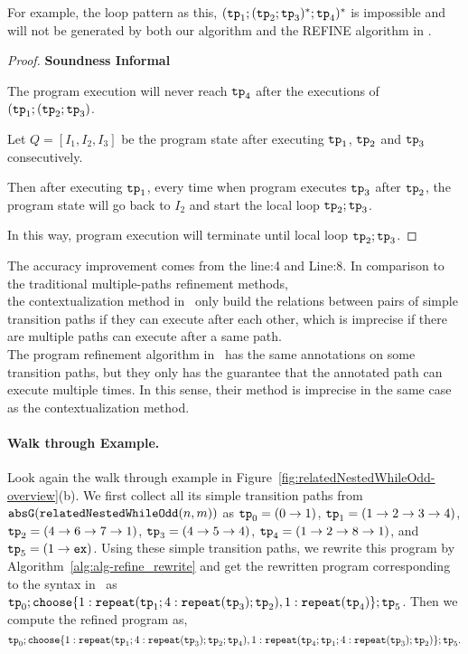   For example, the loop pattern as this,
  $(\mathtt{tp}_1;(\mathtt{tp}_2;\mathtt{tp}_{3})^*;\mathtt{tp}_4)^*$ is impossible 
  and will not be generated by both our algorithm and the REFINE algorithm in \cite{GulwaniJK09}.
\begin{proof}
\textbf{Soundness Informal}

The program execution will never reach $\mathtt{tp}_4$ after the executions of
$(\mathtt{tp}_1;(\mathtt{tp}_2;\mathtt{tp}_{3})$.

Let $Q = [I_1, I_2, I_3]$ be the program state after executing
$\mathtt{tp}_1$, $\mathtt{tp}_2$ and $\mathtt{tp}_3$ consecutively.

Then after executing $\mathtt{tp}_1$,
every time when program executes $\mathtt{tp}_{3}$ after $\mathtt{tp}_2$,
the program state will go back to $I_2$ and start the local loop $\mathtt{tp}_2; \mathtt{tp}_3$.

In this way, program execution will terminate until local loop $\mathtt{tp}_2;\mathtt{tp}_3$.
\end{proof}

The accuracy improvement comes from the line:4 and Line:8.
    In comparison to the traditional multiple-paths refinement methods,
    \\
    the contextualization method in~\cite{ZulegerGSV11} only build the relations between pairs of
    simple transition paths if they can execute after each other, which is imprecise if there are multiple paths
    can execute after a same path.
    \\
    The program refinement algorithm in~\cite{GulwaniJK09} has the same annotations on some transition paths,
    but they only has the guarantee that
    the annotated path can execute multiple times.
    In this sense, their method is imprecise in the same case as the contextualization method.

\paragraph[example]{Walk through Example.}
Look again the walk through example in Figure~\ref{fig:relatedNestedWhileOdd-overview}(b).
We first collect all its simple transition paths from $\mathtt{abs}{\mathtt{G}}(\mathtt{relatedNestedWhileOdd}(n, m))$ as
$\mathtt{tp}_0 = (0 \to 1)$,
$\mathtt{tp}_1 = (1 \to 2 \to 3 \to 4)$,
$\mathtt{tp}_2 = (4 \to 6 \to 7 \to 1)$,
$\mathtt{tp}_3 = (4 \to 5 \to 4)$, $\mathtt{tp}_4 = (1 \to 2 \to 8 \to 1)$, and $\mathtt{tp}_5 = (1 \to \mathtt{ex})$.
Using these simple transition paths, we rewrite this program by Algorithm~\ref{alg:alg-refine_rewrite} and get the rewritten program corresponding to the syntax in~\cite{GulwaniJK09} as
$ \tpath_0 ; \rpchoose{ 1: \rprepeat(\tpath_1; 4:\rprepeat(\tpath_3); \tpath_2), 
1: \rprepeat(\tpath_4) }; \tpath_5$.
Then we compute the refined program as,
\[
    \tpath_0 ; \rpchoose{ 1: \rprepeat(\tpath_1; 4:\rprepeat(\tpath_3); \tpath_2; \tpath_4), 
    1: \rprepeat(\tpath_4; \tpath_1; 4:\rprepeat(\tpath_3); \tpath_2) }; \tpath_5.
\]

